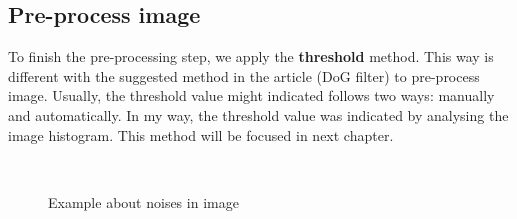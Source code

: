 \subsection{Pre-process image}
To finish the pre-processing step, we apply the \textbf{threshold} method. This way is different with the suggested method in the article\cite{palaniswamy2010automatic} (DoG filter) to pre-process image. Usually, the threshold value might indicated follows two ways: manually and automatically. In my way, the threshold value was indicated by analysing the image histogram. This method will be focused in next chapter.
\begin{figure}[h!]
\centering
{}~~
\caption{Example about noises in image}
\label{fig:figure_21}
\end{figure}
